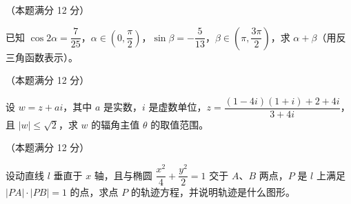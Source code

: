 \begin{question}
（本题满分 12 分）

已知 $\cos 2\alpha=\dfrac{7}{25}$，$\alpha\in\left(0,\dfrac{\pi}{2}\right)$，$\sin\beta=-\dfrac{5}{13}$，$\beta\in\left(\pi,\dfrac{3\pi}{2}\right)$，求 $\alpha+\beta$（用反三角函数表示）。

\end{question}
\begin{question}
（本题满分 12 分）

设 $w=z+ai$，其中 $a$ 是实数，$i$ 是虚数单位，$z=\dfrac{(1-4i)(1+i)+2+4i}{3+4i}$，且 $|w|\le\sqrt{2}$，求 $w$ 的辐角主值 $\theta$ 的取值范围。

\end{question}
\begin{question}
（本题满分 12 分）

设动直线 $l$ 垂直于 $x$ 轴，且与椭圆 $\dfrac{x^{2}}{4}+\dfrac{y^{2}}{2}=1$ 交于 $A$、$B$ 两点，$P$ 是 $l$ 上满足 $|PA|\cdot|PB|=1$ 的点，求点 $P$ 的轨迹方程，并说明轨迹是什么图形。

\end{question}

